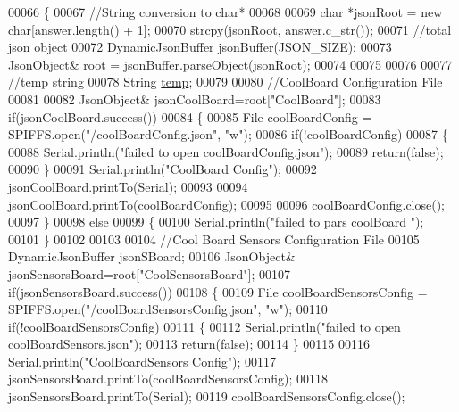 \begin{DoxyCode}
00066 \{
00067     \textcolor{comment}{//String conversion to char*}
00068 
00069     \textcolor{keywordtype}{char} *jsonRoot = \textcolor{keyword}{new} \textcolor{keywordtype}{char}[answer.length() + 1];
00070     strcpy(jsonRoot, answer.c\_str());
00071     \textcolor{comment}{//total json object }
00072     DynamicJsonBuffer jsonBuffer(JSON\_SIZE);
00073     JsonObject& root = jsonBuffer.parseObject(jsonRoot);
00074 
00075 
00076         
00077     \textcolor{comment}{//temp string}
00078     String \hyperlink{_irene3000_8h_a5905d48604152cf57aa6bfa087b49173}{temp};
00079 
00080     \textcolor{comment}{//CoolBoard Configuration File}
00081 
00082         JsonObject& jsonCoolBoard=root[\textcolor{stringliteral}{"CoolBoard"}];
00083     \textcolor{keywordflow}{if}(jsonCoolBoard.success())
00084     \{
00085         File coolBoardConfig = SPIFFS.open(\textcolor{stringliteral}{"/coolBoardConfig.json"}, \textcolor{stringliteral}{"w"});   
00086         \textcolor{keywordflow}{if}(!coolBoardConfig)
00087         \{   
00088             Serial.println(\textcolor{stringliteral}{"failed to open coolBoardConfig.json"});
00089             \textcolor{keywordflow}{return}(\textcolor{keyword}{false});
00090         \}
00091         Serial.println(\textcolor{stringliteral}{"CoolBoard Config"});
00092         jsonCoolBoard.printTo(Serial);
00093         
00094         jsonCoolBoard.printTo(coolBoardConfig);
00095         
00096         coolBoardConfig.close();
00097     \}
00098     \textcolor{keywordflow}{else}
00099     \{
00100         Serial.println(\textcolor{stringliteral}{"failed to pars coolBoard "});
00101     \}       
00102 
00103     
00104     \textcolor{comment}{//Cool Board Sensors Configuration File}
00105     DynamicJsonBuffer jsonSBoard;
00106         JsonObject& jsonSensorsBoard=root[\textcolor{stringliteral}{"CoolSensorsBoard"}];  
00107     \textcolor{keywordflow}{if}(jsonSensorsBoard.success())
00108     \{   
00109         File coolBoardSensorsConfig = SPIFFS.open(\textcolor{stringliteral}{"/coolBoardSensorsConfig.json"}, \textcolor{stringliteral}{"w"}); 
00110         \textcolor{keywordflow}{if}(!coolBoardSensorsConfig)
00111         \{
00112             Serial.println(\textcolor{stringliteral}{"failed to open coolBoardSensors.json"});
00113             \textcolor{keywordflow}{return}(\textcolor{keyword}{false});
00114         \}
00115         
00116         Serial.println(\textcolor{stringliteral}{"CoolBoardSensors Config"});
00117         jsonSensorsBoard.printTo(coolBoardSensorsConfig);
00118         jsonSensorsBoard.printTo(Serial);
00119         coolBoardSensorsConfig.close();

\end{DoxyCode}
